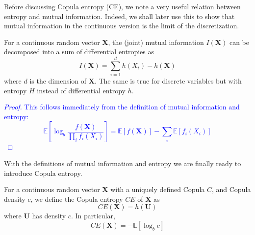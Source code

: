 \documentclass[../Thesis.tex]{subfiles}
\begin{document}
Before discussing Copula entropy (CE), we note a very useful relation between entropy and mutual information. Indeed, we shall later use this to show that mutual information in the continuous version is the limit of the discretization.
\begin{lemma}\label{lemma:mutual information and entropy relation}
    For a continuous random vector $\boldsymbol{X}$, the (joint) mutual information $I\left(\boldsymbol{X}\right)$ can be decomposed into a sum of differential entropies as
    $$I\left(\boldsymbol{X}\right) = \sum_{i=1}^{d} h(X_i) - h\left(\boldsymbol{X}\right)$$
    where $d$ is the dimension of $\boldsymbol{X}$. The same is true for discrete variables but with entropy $H$ instead of differential entropy $h$.
\end{lemma}
\textcolor{blue}{\begin{proof}
        This follows immediately from the definition of mutual information and entropy:
        $$\mathbb{E}\left[\log_b \frac{f\left(\boldsymbol X\right)}{\prod_i f_i\left(X_i\right)}\right] = \mathbb{E}\left[f\left(\boldsymbol X\right) \right] - \sum_i \mathbb{E}\left[f_i \left(X_i\right)\right]$$
    \end{proof}}
With the definitions of mutual information and entropy we are finally ready to introduce Copula entropy.
\begin{definition}\label{def:copula entropy}
    For a continuous random vector $\boldsymbol{X}$ with a uniquely defined Copula $C$, and Copula density $c$, we define the Copula entropy $CE$ of $\boldsymbol{X}$ as
    $$CE\left(\boldsymbol{X}\right) = h\left(\boldsymbol U\right)$$
    where $\boldsymbol U$ has density $c$. In particular,
    $$CE\left(\boldsymbol{X}\right) = - \mathbb{E}\left[\log_b c\right]$$
\end{definition}
\end{document}
